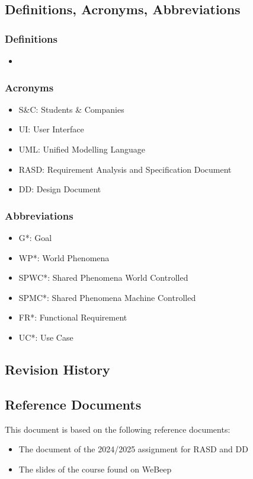 \subsection{Definitions, Acronyms, Abbreviations}

\subsubsection{Definitions}
\begin{itemize}
    \item 
\end{itemize}


\subsubsection{Acronyms}
\begin{itemize}
    \item {S\&C: Students \& Companies}
    \item {UI: User Interface}
    \item {UML: Unified Modelling Language}
    \item {RASD: Requirement Analysis and Specification Document}
    \item {DD: Design Document}
\end{itemize}

\subsubsection{Abbreviations}
\begin{itemize}
    \item {G*: Goal}
    \item {WP*: World Phenomena}
    \item {SPWC*: Shared Phenomena World Controlled}
    \item {SPMC*: Shared Phenomena Machine Controlled}
    \item {FR*: Functional Requirement}
    \item {UC*: Use Case}
\end{itemize}

\subsection{Revision History}

\subsection{Reference Documents}
This document is based on the following reference documents:
\begin{itemize}
\item {The document of the 2024/2025 assignment for RASD and DD }
\item {The slides of the course found on WeBeep}
\end{itemize}

